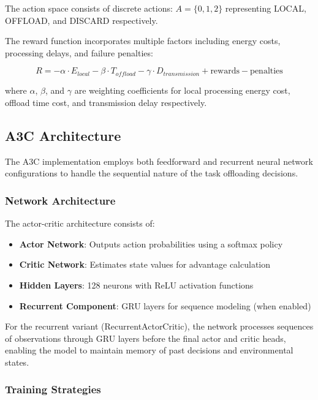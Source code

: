 \documentclass[journal]{IEEEtran}
\begin{document}
The action space consists of discrete actions: $A = \{0, 1, 2\}$ representing LOCAL, OFFLOAD, and DISCARD respectively.

The reward function incorporates multiple factors including energy costs, processing delays, and failure penalties:

\begin{equation}
R = -\alpha \cdot E_{local} - \beta \cdot T_{offload} - \gamma \cdot D_{transmission} + \text{rewards} - \text{penalties}
\end{equation}

where $\alpha$, $\beta$, and $\gamma$ are weighting coefficients for local processing energy cost, offload time cost, and transmission delay respectively.

\subsection{A3C Architecture}

The A3C implementation employs both feedforward and recurrent neural network configurations to handle the sequential nature of the task offloading decisions.

\subsubsection{Network Architecture}

The actor-critic architecture consists of:
\begin{itemize}
\item \textbf{Actor Network}: Outputs action probabilities using a softmax policy
\item \textbf{Critic Network}: Estimates state values for advantage calculation
\item \textbf{Hidden Layers}: 128 neurons with ReLU activation functions
\item \textbf{Recurrent Component}: GRU layers for sequence modeling (when enabled)
\end{itemize}

For the recurrent variant (RecurrentActorCritic), the network processes sequences of observations through GRU layers before the final actor and critic heads, enabling the model to maintain memory of past decisions and environmental states.

\subsubsection{Training Strategies}
\end{document}
